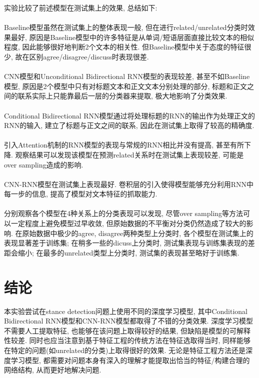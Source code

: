 \documentclass[a4paper]{article}
\begin{document}
	实验比较了前述模型在测试集上的效果, 总结如下:\\\\
	Baseline模型虽然在测试集上的整体表现一般, 但在进行related/unrelated分类时效果最好, 原因是Baseline模型中的许多特征是从单词/短语层面直接比较文本的相似程度, 因此能够很好地判断2个文本的相关性. 但Baseline模型中关于态度的特征很少, 故在区别agree/disagree/discuss时表现很差.\\\\
	CNN模型和Unconditional Bidirectional RNN模型的表现较差, 甚至不如Baseline模型, 原因是2个模型中只有对标题文本和正文文本分别处理的部分, 标题和正文之间的联系实际上只能靠最后一层的分类器来提取, 极大地影响了分类效果.\\\\
	Conditional Bidirectional RNN模型通过将处理标题的RNN的输出作为处理正文的RNN的输入, 建立了标题与正文之间的联系, 因此在测试集上取得了较高的精确度.\\\\
	引入Attention机制的RNN模型的表现与常规的RNN相比并没有提高, 甚至有所下降. 观察结果可以发现该模型在预测related关系时在测试集上表现较差, 可能是over sampling造成的影响.\\\\
	CNN-RNN模型在测试集上表现最好. 卷积层的引入使得模型能够充分利用RNN中每一步的信息, 提高了模型对文本特征的抓取能力.\\\\
	分别观察各个模型在4种关系上的分类表现可以发现, 尽管over sampling等方法可以一定程度上避免模型过早收敛, 但原始数据的不平衡对分类仍然造成了较大的影响. 在原始数据中极少的agree, disagree两种类型上分类时, 各个模型在测试集上的表现显著差于训练集; 在稍多一些的dicuss上分类时, 测试集表现与训练集表现的差距会缩小; 在最多的unrelated类型上分类时, 测试集的表现甚至略好于训练集.

	\section{结论}
	本实验尝试在stance detection问题上使用不同的深度学习模型, 其中Conditional Bidirectional RNN模型和CNN-RNN模型都取得了不错的分类效果. 深度学习模型不需要人工提取特征, 也能够在该问题上取得较好的结果, 但缺陷是模型的可解释性较差. 同时也应当注意到基于特征工程的传统方法在特征选取得当时, 同样能够在特定的问题(如unrelated的分类)上取得很好的效果. 无论是特征工程方法还是深度学习模型, 都需要对问题本身有深入的理解才能提取出恰当的特征/构建合理的网络结构, 从而更好地解决问题.
	
	
	\renewcommand{\refname}{参考文献}
	
	\clearpage
	
\end{document}
